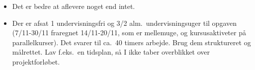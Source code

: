 \begin{itemize}
  \item Det er bedre at aflevere noget end intet.
  \item Der er afsat 1 undervisningsfri og 3/2 alm.\ undervisningsuger til opgaven (7/11-30/11 fraregnet 14/11-20/11, som er mellemuge, og kursusaktiveter på parallelkurser). Det svarer til ca.\ 40 timers arbejde. Brug dem struktureret og målrettet. Lav f.eks.\ en tidsplan, så I ikke taber overblikket over projektforløbet.
  \end{itemize}
